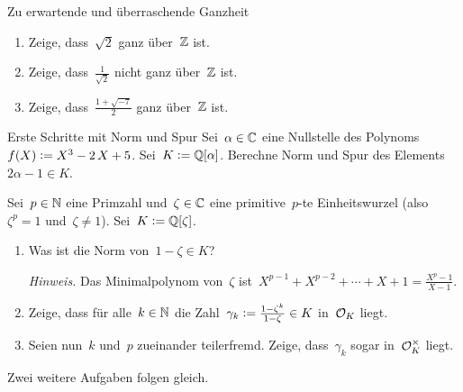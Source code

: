 \documentclass{uebblatt}
\begin{document}

\begin{aufgabe}{Zu erwartende und überraschende Ganzheit}
\begin{enumerate}
\item Zeige, dass~$\sqrt{2}$ ganz über~$\mathbb{Z}$ ist.
\item Zeige, dass~$\tfrac{1}{\sqrt{2}}$ nicht ganz über~$\mathbb{Z}$ ist.
\item Zeige, dass~$\tfrac{1+\sqrt{-7}}{2}$ ganz über~$\mathbb{Z}$ ist.
\end{enumerate}
\end{aufgabe}

\begin{aufgabe}{Erste Schritte mit Norm und Spur}
Sei~$\alpha \in \mathbb{C}$ eine Nullstelle des Polynoms~$f(X) \vcentcolon= X^3 - 2\,X + 5$.
Sei~$K \vcentcolon= \mathbb{Q}[\alpha]$. Berechne Norm und Spur des Elements~$2\alpha - 1
\in K$.
\end{aufgabe}

\begin{aufgabe}{}
Sei~$p \in \mathbb{N}$ eine Primzahl und~$\zeta \in \mathbb{C}$ eine primitive~$p$-te
Einheitswurzel (also~$\zeta^p = 1$ und~$\zeta \neq 1$). Sei~$K \vcentcolon=
\mathbb{Q}[\zeta]$.
\begin{enumerate}
\item Was ist die Norm von~$1 - \zeta \in K$?

{\tiny\emph{Hinweis.} Das Minimalpolynom von~$\zeta$ ist~$X^{p-1} + X^{p-2} +
\cdots + X + 1 = \tfrac{X^p - 1}{X-1}$.\par}
\item Zeige, dass für alle~$k \in \mathbb{N}$ die Zahl~$\gamma_k \vcentcolon=
\tfrac{1-\zeta^k}{1-\zeta} \in K$ in~$\mathcal{O}_K$ liegt.
\item Seien nun~$k$ und~$p$ zueinander teilerfremd. Zeige, dass~$\gamma_k$
sogar in~$\mathcal{O}_K^\times$ liegt.
\end{enumerate}
\end{aufgabe}

Zwei weitere Aufgaben folgen gleich.
\end{document}

